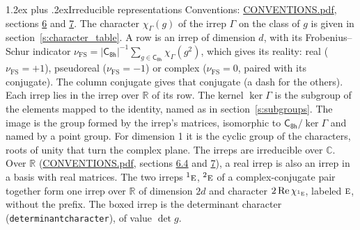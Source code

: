 \documentclass[10pt,a4paper]{article}
\makeatletter
\renewcommand\section{\@startsection{section}{1}{\z@}{-3ex plus -1ex minus -.2ex}%
  {1.2ex plus .2ex}{\normalfont\large\sffamily\bfseries\color{parttitle}}}
\numberwithin{equation}{section}
\newcommand{\grp}[1]{\mathsf{#1}}
\newcommand{\irr}[1]{\text{\normalfont\scshape #1}}
\newcommand{\conjpair}[1]{{}^{#1}}
\newcommand{\irchar}[1]{\chi_{#1}}
\newcommand{\fsind}{\nu_{\mathrm{FS}}}
\makeatother
\begin{document}
\section{Irreducible representations}\label{s:irreps}
Conventions: \href{../../CONVENTIONS.pdf}{CONVENTIONS.pdf}, sections \href{../../CONVENTIONS.pdf\#conv.6}{6} and \href{../../CONVENTIONS.pdf\#conv.7}{7}.
\leavevmode\label{n:function.character}\label{n:irrep.Gamma}The character $\irchar{\Gamma}(g)$ of the irrep $\Gamma$ on the class of $g$ is given in section~\ref{s:character_table}.
\leavevmode\label{n:index.dimension}\label{n:index.frobenius}\label{n:head.irrep}\label{n:head.reality}A row is an irrep of dimension $d$, with its Frobenius--Schur indicator $\fsind = |\grp{C_{8h}}|^{-1}\allowbreak\sum_{g\in\grp{C_{8h}}}\irchar{\Gamma}(g^2)$, which gives its reality: real ($\fsind = +1$), pseudoreal ($\fsind = -1$) or complex ($\fsind = 0$, paired with its conjugate). \label{n:head.conjugate}The column conjugate gives that conjugate (a dash for the others). \label{n:head.over.real}Each irrep lies in the irrep over $\mathbb{R}$ of its row. \label{n:head.kernel}The kernel $\ker\Gamma$ is the subgroup of the elements mapped to the identity, named as in section~\ref{s:subgroups}. \label{n:head.image}The image is the group formed by the irrep's matrices, isomorphic to $\grp{C_{8h}}/\ker\Gamma$ and named by a point group. For dimension 1 it is the cyclic group of the characters, roots of unity that turn the complex plane. The irreps are irreducible over $\mathbb{C}$. Over $\mathbb{R}$ (\href{../../CONVENTIONS.pdf}{CONVENTIONS.pdf}, sections \href{../../CONVENTIONS.pdf\#conv.6.4}{6.4} and \href{../../CONVENTIONS.pdf\#conv.7}{7}), a real irrep is also an irrep in a basis with real matrices. The two irreps $\conjpair{1}\irr{e}$, $\conjpair{2}\irr{e}$ of a complex-conjugate pair together form one irrep over $\mathbb{R}$ of dimension $2d$ and character $2\operatorname{Re}\irchar{\conjpair{1}\irr{e}}$, labeled $\irr{e}$, without the prefix. \label{n:mark.determinant}The boxed irrep is the determinant character (\texttt{determinantcharacter}), of value $\det g$.
\setlength{\emergencystretch}{2em}\par\setlength{\emergencystretch}{0pt}
\end{document}
